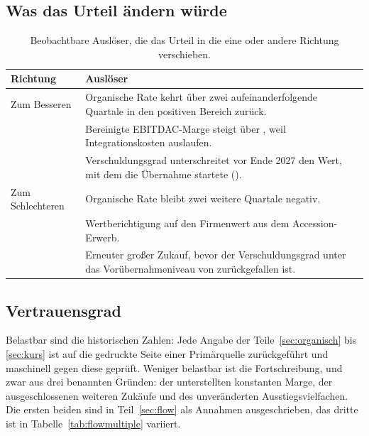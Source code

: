 \subsection{Was das Urteil \"andern w\"urde}

\begin{table}[htbp]
\centering
\caption{Beobachtbare Ausl\"oser, die das Urteil in die eine oder andere
Richtung verschieben.}
\label{tab:ausloeser}
\begin{tabularx}{\linewidth}{lX}
\toprule
Richtung & Ausl\"oser\\
\midrule
Zum Besseren & Organische Rate kehrt \"uber zwei aufeinanderfolgende Quartale in den positiven Bereich zur\"uck.\\
             & Bereinigte EBITDAC-Marge steigt \"uber \Pct{\EBITDACberMarge}, weil Integrationskosten auslaufen.\\
             & Verschuldungsgrad unterschreitet vor Ende 2027 den Wert, mit dem
               die \"Ubernahme startete (\Faktor{\VerschuldungsgradProForma}).\\
\midrule
Zum Schlechteren & Organische Rate bleibt zwei weitere Quartale negativ.\\
             & Wertberichtigung auf den Firmenwert aus dem Accession-Erwerb.\\
             & Erneuter gro{\ss}er Zukauf, bevor der Verschuldungsgrad unter das Vor\"ubernahmeniveau von \Faktor{\VerschuldungsgradVJ} zur\"uckgefallen ist.\\
\bottomrule
\end{tabularx}
\end{table}

\FloatBarrier

\subsection{Vertrauensgrad}

 Belastbar sind
die historischen Zahlen: Jede Angabe der Teile~\ref{sec:organisch} bis
\ref{sec:kurs} ist auf die gedruckte Seite einer Prim\"arquelle
zur\"uckgef\"uhrt und maschinell gegen diese gepr\"uft. Weniger belastbar
ist die Fortschreibung, und zwar aus drei benannten Gr\"unden: der
unterstellten konstanten Marge, der ausgeschlossenen weiteren Zuk\"aufe und
des unver\"anderten Ausstiegsvielfachen. Die ersten beiden sind in
Teil~\ref{sec:flow} als Annahmen ausgeschrieben, das dritte ist in
Tabelle~\ref{tab:flowmultiple} variiert.

